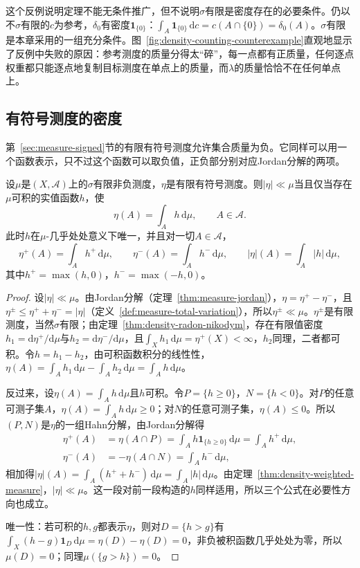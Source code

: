 这个反例说明定理不能无条件推广，但不说明$\sigma$有限是密度存在的必要条件。仍以不$\sigma$有限的$c$为参考，$\delta_0$有密度$\mathbf 1_{\{0\}}$：$\int_A\mathbf 1_{\{0\}}\,\mathrm dc=c(A\cap\{0\})=\delta_0(A)$。$\sigma$有限是本章采用的一组充分条件。图~\ref{fig:density-counting-counterexample}直观地显示了反例中失败的原因：参考测度的质量分得太“碎”，每一点都有正质量，任何逐点权重都只能逐点地复制目标测度在单点上的质量，而$\lambda$的质量恰恰不在任何单点上。

\subsection{有符号测度的密度}
\label{sec:density-signed}

第~\ref{sec:measure-signed}节的有限有符号测度允许集合质量为负。它同样可以用一个函数表示，只不过这个函数可以取负值，正负部分别对应Jordan分解的两项。

\begin{theorem}[有符号测度的密度]
\label{thm:density-signed}
设$\mu$是$(X,\mathcal A)$上的$\sigma$有限非负测度，$\eta$是有限有符号测度。则$|\eta|\ll\mu$当且仅当存在$\mu$可积的实值函数$h$，使
\[
 \eta(A)=\int_Ah\,\mathrm d\mu,\qquad A\in\mathcal A .
\]
此时$h$在$\mu$-几乎处处意义下唯一，并且对一切$A\in\mathcal A$，
\[
 \eta^+(A)=\int_Ah^+\,\mathrm d\mu,\qquad \eta^-(A)=\int_Ah^-\,\mathrm d\mu,\qquad |\eta|(A)=\int_A|h|\,\mathrm d\mu,
\]
其中$h^+=\max(h,0)$，$h^-=\max(-h,0)$。
\end{theorem}

\begin{proof}
设$|\eta|\ll\mu$。由Jordan分解（定理~\ref{thm:measure-jordan}），$\eta=\eta^+-\eta^-$，且$\eta^\pm\le\eta^++\eta^-=|\eta|$（定义~\ref{def:measure-total-variation}），所以$\eta^\pm\ll\mu$。$\eta^\pm$是有限测度，当然$\sigma$有限；由定理~\ref{thm:density-radon-nikodym}，存在有限值密度$h_1=\mathrm d\eta^+/\mathrm d\mu$与$h_2=\mathrm d\eta^-/\mathrm d\mu$，且$\int_Xh_1\,\mathrm d\mu=\eta^+(X)<\infty$，$h_2$同理，二者都可积。令$h=h_1-h_2$，由可积函数积分的线性性，$\eta(A)=\int_Ah_1\,\mathrm d\mu-\int_Ah_2\,\mathrm d\mu=\int_Ah\,\mathrm d\mu$。

反过来，设$\eta(A)=\int_Ah\,\mathrm d\mu$且$h$可积。令$P=\{h\ge0\}$，$N=\{h<0\}$。对$P$的任意可测子集$A$，$\eta(A)=\int_Ah\,\mathrm d\mu\ge0$；对$N$的任意可测子集，$\eta(A)\le0$。所以$(P,N)$是$\eta$的一组Hahn分解，由Jordan分解得
\[
 \begin{aligned}
  \eta^+(A)&=\eta(A\cap P)=\int_Ah\mathbf 1_{\{h\ge0\}}\,\mathrm d\mu=\int_Ah^+\,\mathrm d\mu,\\
  \eta^-(A)&=-\eta(A\cap N)=\int_Ah^-\,\mathrm d\mu,
 \end{aligned}
\]
相加得$|\eta|(A)=\int_A(h^++h^-)\,\mathrm d\mu=\int_A|h|\,\mathrm d\mu$。由定理~\ref{thm:density-weighted-measure}，$|\eta|\ll\mu$。这一段对前一段构造的$h$同样适用，所以三个公式在必要性方向也成立。

唯一性：若可积的$h,g$都表示$\eta$，则对$D=\{h>g\}$有$\int_X(h-g)\mathbf 1_D\,\mathrm d\mu=\eta(D)-\eta(D)=0$，非负被积函数几乎处处为零，所以$\mu(D)=0$；同理$\mu(\{g>h\})=0$。
\end{proof}

